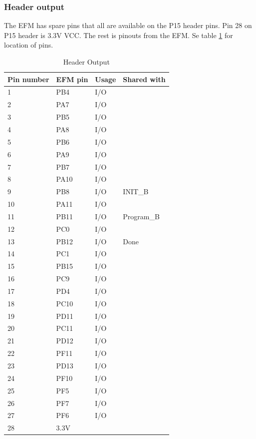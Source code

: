 \subsubsection{Header output}
The EFM has spare pins that all are available on the P15 header pins. Pin 28 on P15 header is 3.3V VCC. The rest is pinouts from the EFM. Se table \ref{tab:HeaderOut} for location of pins.
\begin{table}[]
    \centering
    \begin{tabular}{llll}
        Pin number & EFM pin & Usage & Shared with \\
        \hline
        1       & PB4     & I/O   &             \\
        2       & PA7     & I/O   &             \\
        3       & PB5     & I/O   &             \\
        4       & PA8     & I/O   &             \\
        5       & PB6     & I/O   &             \\
        6       & PA9     & I/O   &             \\
        7       & PB7     & I/O   &             \\
        8       & PA10    & I/O   &             \\
        9       & PB8     & I/O   & INIT\_B     \\
        10      & PA11    & I/O   &             \\
        11      & PB11    & I/O   & Program\_B  \\
        12      & PC0     & I/O   &             \\
        13      & PB12    & I/O   & Done        \\
        14      & PC1     & I/O   &             \\
        15      & PB15    & I/O   &             \\
        16      & PC9     & I/O   &             \\
        17      & PD4     & I/O   &             \\
        18      & PC10    & I/O   &             \\
        19      & PD11    & I/O   &             \\
        20      & PC11    & I/O   &             \\
        21      & PD12    & I/O   &             \\
        22      & PF11    & I/O   &             \\
        23      & PD13    & I/O   &             \\
        24      & PF10    & I/O   &             \\
        25      & PF5     & I/O   &             \\
        26      & PF7     & I/O   &             \\
        27      & PF6     & I/O   &             \\
        28      & 3.3V    &       &
    \end{tabular}
    \caption{Header Output}
    \label{tab:HeaderOut}
\end{table}

